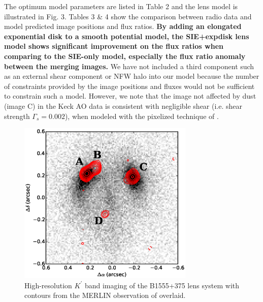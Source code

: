 \documentclass[useAMS,usenatbib]{mn2e}
\begin{document}
The optimum model parameters are listed in Table 2 and the lens model is illustrated in Fig. 3. 
Tables 3 \& 4 show the comparison between radio data and model predicted image positions and flux ratios.  
\textbf{By adding an elongated exponential disk to a smooth potential model, the SIE+expdisk lens model shows significant improvement on the flux ratios when comparing to the SIE-only model, especially the flux ratio anomaly between the merging images.}
We have not included a third component such as an external
shear component or NFW halo into our model because the number of constraints provided by the
image positions and fluxes would not be sufficient to constrain such a
model. However, we note that the image not affected by dust (image C)
in the Keck AO data is consistent with negligible shear (i.e. shear
strength $\Gamma_s=0.002$), when modeled with the pixelized technique
of \citet{V09}.

\begin{figure}
\includegraphics[width=84mm]{1555_ao_merlin_overlay.eps}
\caption{High-resolution  $K^\prime$ band imaging of the B1555+375 lens system 
with contours from the MERLIN observation of \citet{Marlow99} overlaid. 
%
\label{fig:merlin}}
\end{figure}
\end{document}
